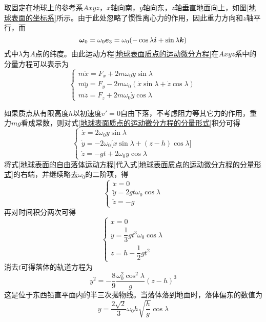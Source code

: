 取固定在地球上的参考系$Axyz$，$x$轴向南，$y$轴向东，$z$轴垂直地面向上，如图\ref{地球表面的坐标系}所示。由于此处忽略了惯性离心力的作用，因此重力方向和$z$轴平行，而
\begin{equation*}
	\boldsymbol{\omega}_0 = \omega_0 \boldsymbol{e}_3 = \omega_0(-\cos \lambda \boldsymbol{i} + \sin \lambda \boldsymbol{k})
\end{equation*}
式中$\lambda$为$A$点的纬度。由此运动方程\eqref{地球表面质点的运动微分方程}在$Axyz$系中的分量方程可以表示为
\begin{equation}
\begin{cases}
	m\ddot{x} = F_x+2m\omega_0 \dot{y} \sin \lambda \\
	m\ddot{y} = F_y-2m\omega_0 (\dot{x} \sin \lambda + \dot{z} \cos \lambda) \\
	m\ddot{z} = F_z+2m\omega_0 \dot{y} \cos \lambda
\end{cases}
\label{地球表面质点的运动微分方程的分量形式}
\end{equation}

如果质点从有限高度$h$以初速度$v' = 0$自由下落，不考虑阻力等其它力的作用，重力$mg$看成常数，则对式\eqref{地球表面质点的运动微分方程的分量形式}积分可得
\begin{equation}
	\begin{cases}
		\dot{x} = 2\omega_0 y\sin \lambda \\
		\dot{y} = -2\omega_0 \big[x\sin \lambda+(z-h) \cos \lambda\big] \\
		\dot{z} = -gt + 2\omega_0 y \cos \lambda
	\end{cases}
	\label{地球表面的自由落体运动方程}
\end{equation}
将式\eqref{地球表面的自由落体运动方程}代入式\eqref{地球表面质点的运动微分方程的分量形式}的右端，并继续略去$\omega_0$的二阶项，得
\begin{equation*}
\begin{cases}
	\ddot{x} = 0 \\
	\ddot{y} = 2gt\omega_0\cos \lambda \\
	\ddot{z} = -g
\end{cases}
\end{equation*}
再对时间积分两次可得
\begin{equation}
\begin{cases}
	x = 0 \\[1.5ex]
	y = \dfrac13 gt^3 \omega_0 \cos \lambda \\[1.5ex]
	z = h - \dfrac12 gt^2
\end{cases}
\label{地球表面的自由落体的解}
\end{equation}
消去$t$可得落体的轨道方程为
\begin{equation*}
	y^2 = -\frac89 \frac{\omega_0^2 \cos^2 \lambda}{g} (z-h)^3
\end{equation*}
这是位于东西铅直平面内的半三次拋物线。当落体落到地面时，落体偏东的数值为
\begin{equation}
	y = \frac{2\sqrt{2}}{3} \omega_0 h \sqrt{\frac{h}{g}} \cos \lambda
\end{equation}

